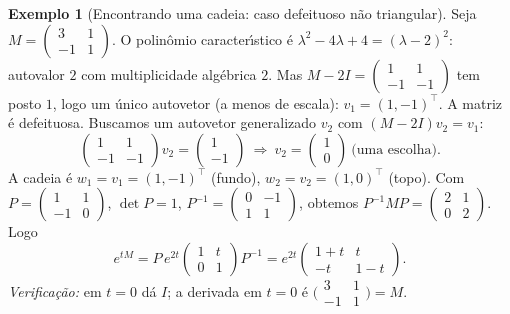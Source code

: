 \documentclass[11pt,a4paper]{amsart}
\theoremstyle{plain}
\theoremstyle{definition}
\newtheorem{exemplo}[teorema]{Exemplo}
\theoremstyle{remark}
\begin{document}
\begin{exemplo}[Encontrando uma cadeia: caso defeituoso n\~ao triangular]
\label{ex:cadeia2}
Seja $M=\begin{pmatrix}3&1\\-1&1\end{pmatrix}$. O polin\^omio
caracter\'\i stico \'e $\lambda^2-4\lambda+4=(\lambda-2)^2$: autovalor $2$ com
multiplicidade alg\'ebrica $2$. Mas
$M-2I=\begin{pmatrix}1&1\\-1&-1\end{pmatrix}$ tem posto $1$, logo um \'unico
autovetor (a menos de escala): $v_1=(1,-1)^\top$. A matriz \'e defeituosa.
Buscamos um autovetor generalizado $v_2$ com $(M-2I)v_2=v_1$:
\[
  \begin{pmatrix}1&1\\-1&-1\end{pmatrix}v_2=\begin{pmatrix}1\\-1\end{pmatrix}
  \ \Longrightarrow\ v_2=\begin{pmatrix}1\\0\end{pmatrix}\ \text{(uma escolha).}
\]
A cadeia \'e $w_1=v_1=(1,-1)^\top$ (fundo), $w_2=v_2=(1,0)^\top$ (topo). Com
$P=\begin{pmatrix}1&1\\-1&0\end{pmatrix}$, $\det P=1$,
$P^{-1}=\begin{pmatrix}0&-1\\1&1\end{pmatrix}$, obtemos
$P^{-1}MP=\begin{pmatrix}2&1\\0&2\end{pmatrix}$. Logo
\[
  e^{tM}=P\,e^{2t}\begin{pmatrix}1&t\\0&1\end{pmatrix}P^{-1}
        =e^{2t}\begin{pmatrix}1+t & t\\ -t & 1-t\end{pmatrix}.
\]
\emph{Verifica\c{c}\~ao:} em $t=0$ d\'a $I$; a derivada em $t=0$ \'e
$\big(\begin{smallmatrix}3&1\\-1&1\end{smallmatrix}\big)=M$.
\end{exemplo}
\end{document}
